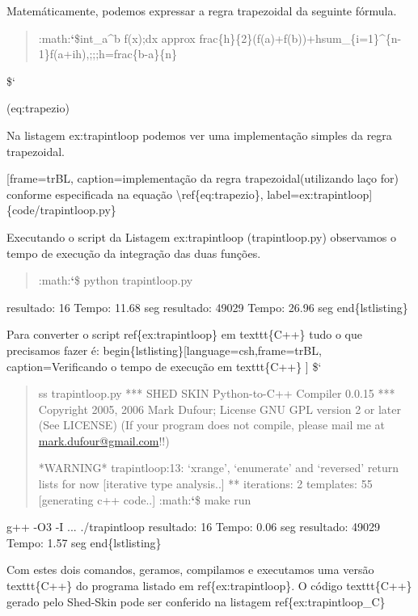 \documentclass[a4paper,10pt,portuguese]{sphinxmanual}
\begin{document}
Matemáticamente, podemos expressar a regra trapezoidal da seguinte
fórmula.
\begin{quote}

:math:{\color{red}\bfseries{}{}`}\$int\_a\textasciicircum{}b f(x);dx approx frac\{h\}\{2\}(f(a)+f(b))+hsum\_\{i=1\}\textasciicircum{}\{n-1\}f(a+ih),;;;h=frac\{b-a\}\{n\}
\end{quote}

\${}`

(eq:trapezio)

Na listagem ex:trapintloop podemos ver uma implementação simples da
regra trapezoidal.

{[}frame=trBL, caption=implementação  da regra trapezoidal(utilizando laço for) conforme especificada na equação \textbackslash{}ref\{eq:trapezio\}, label=ex:trapintloop{]} \{code/trapintloop.py\}

Executando o script da Listagem ex:trapintloop (trapintloop.py)
observamos o tempo de execução da integração das duas funções.
\begin{quote}

:math:{\color{red}\bfseries{}{}`}\$ python trapintloop.py
\end{quote}

resultado: 16
Tempo: 11.68 seg
resultado: 49029
Tempo: 26.96 seg
end\{lstlisting\}

Para converter o script ref\{ex:trapintloop\} em texttt\{C++\} tudo o que precisamos fazer é:
begin\{lstlisting\}{[}language=csh,frame=trBL, caption=Verificando o tempo de execução em texttt\{C++\} {]}
\${}`
\begin{quote}

ss trapintloop.py *** SHED SKIN Python-to-C++ Compiler 0.0.15
*** Copyright 2005, 2006 Mark Dufour; License GNU GPL version 2
or later (See LICENSE) (If your program does not compile, please
mail me at \href{mailto:mark.dufour@gmail.com}{mark.dufour@gmail.com}!!)

*WARNING* trapintloop:13: `xrange', `enumerate' and `reversed'
return lists for now {[}iterative type analysis..{]} ** iterations: 2
templates: 55 {[}generating c++ code..{]}
:math:{\color{red}\bfseries{}{}`}\$ make run
\end{quote}

g++ -O3  -I ...
./trapintloop
resultado: 16
Tempo: 0.06 seg
resultado: 49029
Tempo: 1.57 seg
end\{lstlisting\}

Com estes dois comandos, geramos, compilamos e executamos uma versão texttt\{C++\} do programa listado em ref\{ex:trapintloop\}. O código texttt\{C++\} gerado pelo Shed-Skin pode ser conferido na listagem ref\{ex:trapintloop\_C\}
\end{document}
